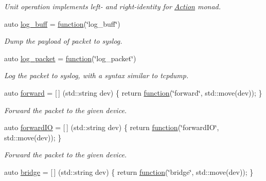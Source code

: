 \begin{DoxyCompactItemize}
\begin{DoxyCompactList}\small\item\em Unit operation implements left-\/ and right-\/identity for \hyperlink{structpfq_1_1lang_1_1Action}{Action} monad. \end{DoxyCompactList}\item 
auto \hyperlink{namespacepfq_1_1lang_1_1anonymous__namespace_02default_8hpp_03_ac16d4c4b496e6e882901d84ded462101}{log\+\_\+buff} = \hyperlink{namespacepfq_1_1lang_a1a4638059d700ae08d0ca63886ff2bb3}{function}(\char`\"{}log\+\_\+buff\char`\"{})
\begin{DoxyCompactList}\small\item\em Dump the payload of packet to syslog. \end{DoxyCompactList}\item 
auto \hyperlink{namespacepfq_1_1lang_1_1anonymous__namespace_02default_8hpp_03_aed6076a98aece625738cbda3689183e2}{log\+\_\+packet} = \hyperlink{namespacepfq_1_1lang_a1a4638059d700ae08d0ca63886ff2bb3}{function}(\char`\"{}log\+\_\+packet\char`\"{})
\begin{DoxyCompactList}\small\item\em Log the packet to syslog, with a syntax similar to tcpdump. \end{DoxyCompactList}\item 
auto \hyperlink{namespacepfq_1_1lang_1_1anonymous__namespace_02default_8hpp_03_aae08247030fea0f5e398b0a03d382257}{forward} = \mbox{[}$\,$\mbox{]} (std\+::string dev) \{ return \hyperlink{namespacepfq_1_1lang_a1a4638059d700ae08d0ca63886ff2bb3}{function}(\char`\"{}forward\char`\"{}, std\+::move(dev)); \}
\begin{DoxyCompactList}\small\item\em Forward the packet to the given device. \end{DoxyCompactList}\item 
auto \hyperlink{namespacepfq_1_1lang_1_1anonymous__namespace_02default_8hpp_03_a3fb6ec42e38c3329534ea3a7024fd967}{forward\+IO} = \mbox{[}$\,$\mbox{]} (std\+::string dev) \{ return \hyperlink{namespacepfq_1_1lang_a1a4638059d700ae08d0ca63886ff2bb3}{function}(\char`\"{}forward\+IO\char`\"{}, std\+::move(dev)); \}
\begin{DoxyCompactList}\small\item\em Forward the packet to the given device. \end{DoxyCompactList}\item 
auto \hyperlink{namespacepfq_1_1lang_1_1anonymous__namespace_02default_8hpp_03_ad318dd8fb6441b78bdfb056173e5a7e2}{bridge} = \mbox{[}$\,$\mbox{]} (std\+::string dev) \{ return \hyperlink{namespacepfq_1_1lang_a1a4638059d700ae08d0ca63886ff2bb3}{function}(\char`\"{}bridge\char`\"{}, std\+::move(dev)); \}

\end{DoxyCompactItemize}
